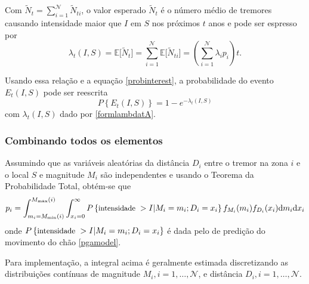 Com $\tilde N_t=\sum_{i=1}^{\mathcal{N}} \tilde N_{t i}$,
o valor esperado $\tilde N_t$ é o número médio de tremores causando intensidade maior que $I$ em $S$
 nos próximos $t$ anos e pode ser espresso por
\begin{equation} \label{formlambdatA}
\lambda_t(I, S)=\mathbb{E}\Big[ \tilde N_t \Big] =\sum_{i=1}^{\mathcal{N}} \mathbb{E}\Big[ \tilde N_{t i}\Big] =
\left( \sum_{i=1}^{\mathcal{N}} \lambda_i p_i \right) t.
\end{equation}

Usando essa relação e a equação \eqref{probinterest}, a probabilidade do evento $E_t(I, S)$
pode ser reescrita
\begin{equation}
P \left\{   E_t(I, S) \right\} =1-e^{-\lambda_t(I, S)}
\end{equation}
com $\lambda_t(I, S)$ dado por \eqref{formlambdatA}.


\subsubsection{Combinando todos os elementos}

Assumindo que as variáveis aleatórias da distância $D_i$ entre o tremor na zona $i$ e o local $S$ e magnitude $M_i$
são independentes e usando o Teorema da Probabilidade Total, obtém-se que
\begin{equation} 
p_i= \displaystyle \int_{m_i =M_{\min}(i)}^{M_{\max}(i)}
\int_{x_i =0}^{\infty}  P \left\{ \mbox{\small intensidade \normalsize }>I| M_i = m_i; D_i = x_i \right\}f_{M_i}(m_i) f_{D_i}( x_i )
\mathrm{d}m_i \mathrm{d}x_i
\end{equation}
onde $P \left\{ \mbox{\small intensidade \normalsize }>I| M_i = m_i; D_i = x_i \right\}$ 
é dada pelo de predição do movimento do chão \eqref{pgamodel}.

Para implementação, a integral acima é geralmente estimada discretizando as distribuições contínuas de 
magnitude $M_i, i=1,\ldots, \mathcal{N}$, e distância $D_i, i=1,\ldots, \mathcal{N}$.

